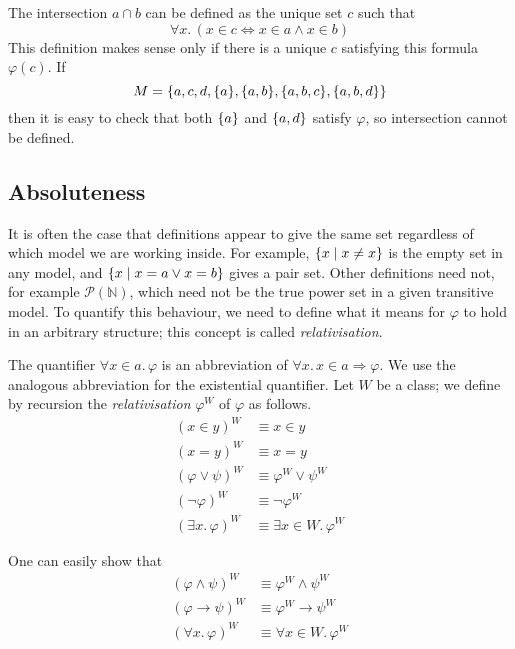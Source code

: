 \begin{example}
    The intersection \( a \cap b \) can be defined as the unique set \( c \) such that
    \[ \forall x.\, (x \in c \iff x \in a \wedge x \in b) \]
    This definition makes sense only if there is a unique \( c \) satisfying this formula \( \varphi(c) \).
    If
    \[ M = \qty{a, c, d, \qty{a}, \qty{a, b}, \qty{a, b, c}, \qty{a, b, d}} \]
    then it is easy to check that both \( \qty{a} \) and \( \qty{a, d} \) satisfy \( \varphi \), so intersection cannot be defined.
\end{example}

\subsection{Absoluteness}
It is often the case that definitions appear to give the same set regardless of which model we are working inside.
For example, \( \qty{x \mid x \neq x} \) is the empty set in any model, and \( \qty{x \mid x = a \vee x = b} \) gives a pair set.
Other definitions need not, for example \( \mathcal P(\mathbb N) \), which need not be the true power set in a given transitive model.
To quantify this behaviour, we need to define what it means for \( \varphi \) to hold in an arbitrary structure; this concept is called \emph{relativisation}.
\begin{definition}
    The quantifier \( \forall x \in a.\, \varphi \) is an abbreviation of \( \forall x.\, x \in a \Rightarrow \varphi \).
    We use the analogous abbreviation for the existential quantifier.
    Let \( W \) be a class; we define by recursion the \emph{relativisation} \( \varphi^W \) of \( \varphi \) as follows.
    \begin{align*}
        (x \in y)^W &\equiv x \in y \\
        (x = y)^W &\equiv x = y \\
        (\varphi \vee \psi)^W &\equiv \varphi^W \vee \psi^W \\
        (\neg \varphi)^W &\equiv \neg \varphi^W \\
        (\exists x.\, \varphi)^W &\equiv \exists x \in W.\, \varphi^W
    \end{align*}
\end{definition}
One can easily show that
\begin{align*}
    (\varphi \wedge \psi)^W &\equiv \varphi^W \wedge \psi^W \\
    (\varphi \to \psi)^W &\equiv \varphi^W \to \psi^W \\
    (\forall x.\, \varphi)^W &\equiv \forall x \in W.\, \varphi^W
\end{align*}
